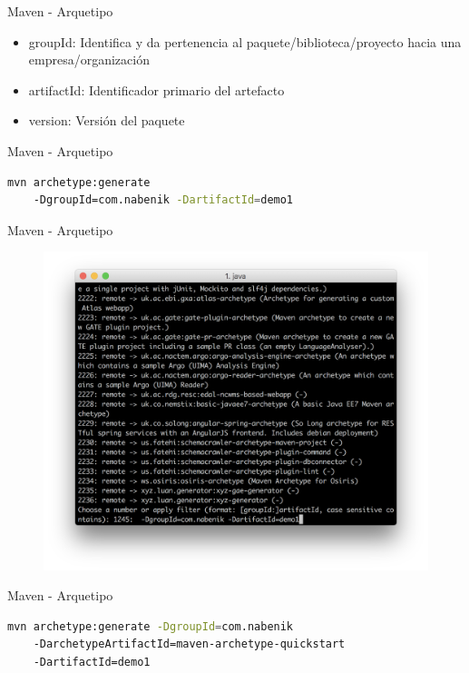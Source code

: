 \documentclass[aspectratio=169]{beamer}
\begin{document}
\begin{frame}{Maven - Arquetipo}
\begin{itemize}
	\item groupId: Identifica y da pertenencia al paquete/biblioteca/proyecto hacia una empresa/organización
	\item artifactId: Identificador primario del artefacto
	\item version: Versión del paquete
\end{itemize}
\end{frame}

\begin{frame}[fragile]{Maven - Arquetipo}
\begin{lstlisting}[language=bash]
mvn archetype:generate
    -DgroupId=com.nabenik -DartifactId=demo1
\end{lstlisting}
\end{frame}

\begin{frame}{Maven - Arquetipo}
\begin{figure}
	\centering
	\includegraphics[width=\linewidth]{Images/mvn}
\end{figure}
\end{frame}

\begin{frame}[fragile]{Maven - Arquetipo}
\begin{lstlisting}[language=bash]
mvn archetype:generate -DgroupId=com.nabenik
    -DarchetypeArtifactId=maven-archetype-quickstart
    -DartifactId=demo1
\end{lstlisting}
\end{frame}
\end{document}
